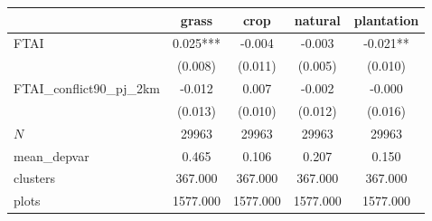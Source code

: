 {
\def\sym#1{\ifmmode^{#1}\else\(^{#1}\)\fi}
\begin{tabular}{l*{4}{c}}
\toprule
          &\multicolumn{1}{c}{grass}&\multicolumn{1}{c}{crop}&\multicolumn{1}{c}{natural}&\multicolumn{1}{c}{plantation}\\
\midrule
FTAI      &    0.025***&   -0.004   &   -0.003   &   -0.021** \\
          &  (0.008)   &  (0.011)   &  (0.005)   &  (0.010)   \\
\addlinespace
FTAI\_conflict90\_pj\_2km&   -0.012   &    0.007   &   -0.002   &   -0.000   \\
          &  (0.013)   &  (0.010)   &  (0.012)   &  (0.016)   \\
\midrule
\(N\)     &    29963   &    29963   &    29963   &    29963   \\
mean\_depvar&    0.465   &    0.106   &    0.207   &    0.150   \\
clusters  &  367.000   &  367.000   &  367.000   &  367.000   \\
plots     & 1577.000   & 1577.000   & 1577.000   & 1577.000   \\
\bottomrule
\end{tabular}
}
